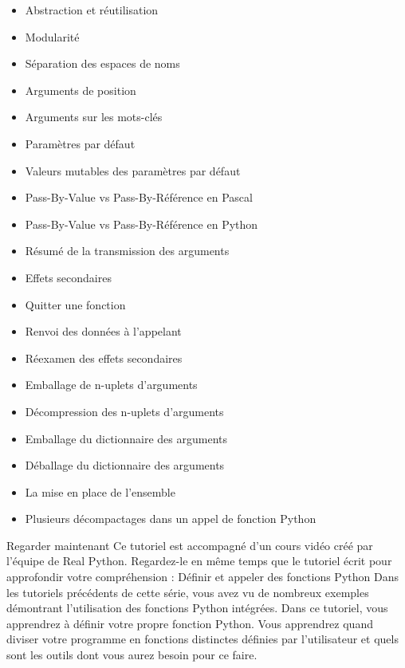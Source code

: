 \begin{itemize}
\item Abstraction et réutilisation
\item Modularité
\item Séparation des espaces de noms
\end{itemize}
\begin{itemize}
\item Arguments de position
\item Arguments sur les mots-clés
\item Paramètres par défaut
\item Valeurs mutables des paramètres par défaut
\item Pass-By-Value vs Pass-By-Référence en Pascal
\item Pass-By-Value vs Pass-By-Référence en Python
\item Résumé de la transmission des arguments
\item Effets secondaires
\end{itemize}
\begin{itemize}
\item Quitter une fonction
\item Renvoi des données à l'appelant
\item Réexamen des effets secondaires
\end{itemize}
\begin{itemize}
\item Emballage de n-uplets d'arguments
\item Décompression des n-uplets d'arguments
\item Emballage du dictionnaire des arguments
\item Déballage du dictionnaire des arguments
\item La mise en place de l'ensemble
\item Plusieurs décompactages dans un appel de fonction Python
\end{itemize}
 Regarder maintenant Ce tutoriel est accompagné d'un cours vidéo créé par l'équipe de Real Python. Regardez-le en même temps que le tutoriel écrit pour approfondir votre compréhension : Définir et appeler des fonctions Python
Dans les tutoriels précédents de cette série, vous avez vu de nombreux exemples démontrant l'utilisation des fonctions Python intégrées.  Dans ce tutoriel, vous apprendrez à définir votre propre fonction Python. Vous apprendrez quand diviser votre programme en fonctions distinctes définies par l'utilisateur et quels sont les outils dont vous aurez besoin pour ce faire.
